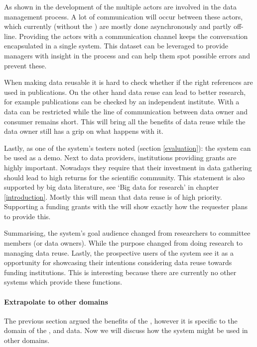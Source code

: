 As shown in the development of the \ivfsystem{} multiple actors are involved in the data management process.
A lot of communication will occur between these actors, which currently (without the \ivfsystem{}) are mostly done asynchronously and partly off-line.
Providing the actors with a communication channel keeps the conversation encapsulated in a single system.
This dataset can be leveraged to provide managers with insight in the process and can help them spot possible errors and prevent these.

When making data reusable it is hard to check whether if the right references are used in publications.
On the other hand data reuse can lead to better research, for example publications can be checked by an independent institute.
With a \ivfsystem{} data can be restricted while the line of communication between data owner and consumer remains short.
This will bring all the benefits of data reuse while the data owner still has a grip on what happens with it.

Lastly, as one of the system's testers noted (section \ref{evaluation}): the system can be used as a demo.
Next to data providers, institutions providing grants are highly important.
Nowadays they require that their investment in data gathering should lead to high returns for the scientific community.
This statement is also supported by big data literature, see `Big data for \project{} research' in chapter \ref{introduction}.
Mostly this will mean that data reuse is of high priority. 
Supporting a funding grants with the \ivfsystem{} will show exactly how the requester plans to provide this.

Summarising, the system's goal audience changed from researchers to committee members (or data owners).
While the purpose changed from doing research to managing data reuse.
Lastly, the prospective users of the system see it as a opportunity for showcasing their intentions considering data reuse towards funding institutions.
This is interesting because there are currently no other systems which provide these functions.

\paragraph{Extrapolate to other domains}

The previous section argued the benefits of the \ivfsystem{}, however it is specific to the domain of the \projectdata{}, \ie{} \IVF{} and \PRN{} data.
Now we will discuss how the system might be used in other domains.

